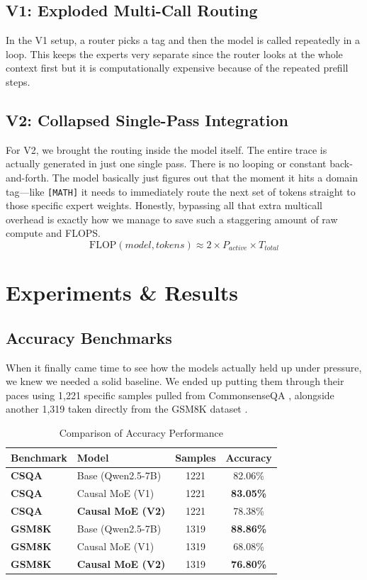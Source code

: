 \documentclass[conference,compsoc]{IEEEtran}
\begin{document}
\subsection{V1: Exploded Multi-Call Routing}
In the V1 setup, a router picks a tag and then the model is called repeatedly in a loop. This keeps the experts very separate since the router looks at the whole context first but it is computationally expensive because of the repeated prefill steps.

\subsection{V2: Collapsed Single-Pass Integration}
For V2, we brought the routing inside the model itself. The entire trace is actually generated in just one single pass. There is no looping or constant back-and-forth. The model basically just figures out that the moment it hits a domain tag—like \texttt{[MATH]} it needs to immediately route the next set of tokens straight to those specific expert weights. Honestly, bypassing all that extra multicall overhead is exactly how we manage to save such a staggering amount of raw compute and FLOPS.
\begin{equation}
\text{FLOP}(model, tokens) \approx 2 \times P_{active} \times T_{total}
\end{equation}

\section{Experiments \& Results}

\subsection{Accuracy Benchmarks}
When it finally came time to see how the models actually held up under pressure, we knew we needed a solid baseline. We ended up putting them through their paces using 1,221 specific samples pulled from CommonsenseQA \cite{b12}, alongside another 1,319 taken directly from the GSM8K dataset \cite{b11}.

\begin{table}[htbp]
\caption{Comparison of Accuracy Performance}
\begin{center}
\begin{tabular}{llcc}
\toprule
\textbf{Benchmark} & \textbf{Model} & \textbf{Samples} & \textbf{Accuracy} \\
\midrule
\textbf{CSQA} & Base (Qwen2.5-7B) & 1221 & 82.06\% \\
\textbf{CSQA} & Causal MoE (V1) & 1221 & \textbf{83.05\%} \\
\textbf{CSQA} & \textbf{Causal MoE (V2)} & 1221 & 78.38\% \\
\midrule
\textbf{GSM8K} & Base (Qwen2.5-7B) & 1319 & \textbf{88.86\%} \\
\textbf{GSM8K} & Causal MoE (V1) & 1319 & 68.08\% \\
\textbf{GSM8K} & \textbf{Causal MoE (V2)} & 1319 & \textbf{76.80\%} \\
\bottomrule
\end{tabular}
\end{center}
\end{table}
\end{document}
